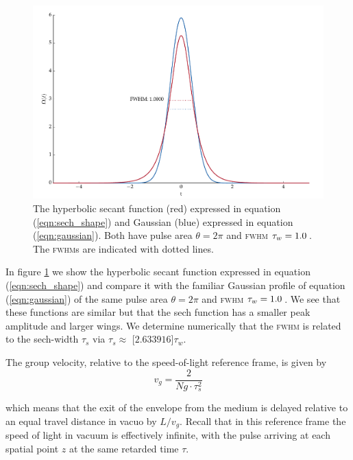     \begin{figure}[]
      \includegraphics[width=\linewidth]
        {figs/03_nonlinear/plot_sech_vs_gaussian_fig1.pdf}
      \caption{
      The hyperbolic secant function (red) expressed in equation
      (\ref{eqn:sech_shape}) and Gaussian (blue) expressed in equation
      (\ref{eqn:gaussian}). Both have pulse area $\theta = 2\pi$ and
      \textsc{fwhm} $\tau_w = \unit[1.0]{}$. The \textsc{fwhm}s are indicated
      with dotted lines.
      }
      \label{fig:sech_vs_gaussian}
    \end{figure}

    In figure \ref{fig:sech_vs_gaussian} we show the hyperbolic secant function
    expressed in equation (\ref{eqn:sech_shape}) and compare it with the
    familiar Gaussian profile of equation (\ref{eqn:gaussian}) of the same pulse
    area $\theta = 2\pi$ and \textsc{fwhm} $\tau_w = \unit[1.0]{}$. We see that
    these functions are similar but that the sech function has a smaller peak
    amplitude and larger wings. We determine numerically that the \textsc{fwhm}
    is related to the sech-width $\tau_s$ via $\tau_s \approx $
    \unit[$2.633916$]{$\tau_w$}.
    
    The group velocity, relative to the speed-of-light reference frame, is given
    by
    \begin{equation}
      v_g = \frac{2}{Ng \cdot \tau_s^2}
      \label{eqn:soliton_group_velocity}
    \end{equation}

    which means that the exit of the envelope from the medium is delayed
    relative to an equal travel distance in vacuo by $L/v_g$. Recall that in
    this reference frame the speed of light in vacuum is effectively infinite,
    with the pulse arriving at each spatial point $z$ at the same retarded time
    $\tau$.

